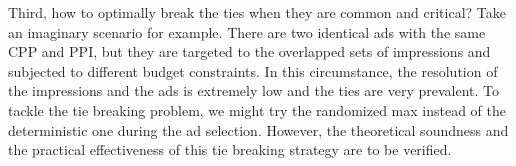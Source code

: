 \documentclass{article}
\newcommand{\sumi}{\sum\limits_i}
\newcommand{\sumj}{\sum\limits_j}
\newcommand{\sumk}{\sum\limits_k}
\newcommand{\sumij}{\sum\limits_{ij}}
\newcommand{\sx}{x_{ij}}
\newcommand{\sV}{V_{ij}}
\newcommand{\sW}{W_{ij}^{(k)}}
\newcommand{\sB}{B^{(k)}}
\newcommand{\salpha}{\alpha^{(k)}}
\newcommand{\sbeta}{\beta_i}
\newcommand{\sgamma}{\gamma_{ij}}
\newcommand{\sS}{S_{ij}}
\newcommand{\ammkpresourceconstraint}{\sumij \sx \sW(\sV) \le \sB}
\newcommand{\assignmentconstraint}{\sumj \sx \le 1}
\newcommand{\scoreconstraint}{\sbeta \ge \sS(\vec{\alpha})}
\begin{document}
Third, how to optimally break the ties when they are common and critical?
Take an imaginary scenario for example.
There are two identical ads with the same CPP and PPI,
    but they are targeted to the overlapped sets of impressions and subjected to different budget constraints.
In this circumstance, the resolution of the impressions and the ads is extremely low and the ties are very prevalent.
To tackle the tie breaking problem, we might try the randomized max instead of the deterministic one during the ad selection.
However, the theoretical soundness and the practical effectiveness of this tie breaking strategy are to be verified.

\clearpage




%
%
%
\end{document}
